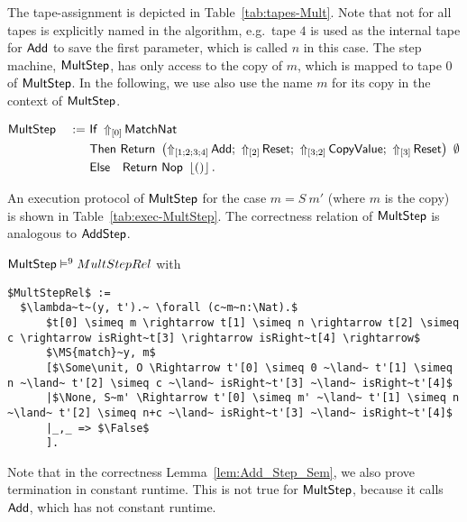 The tape-assignment is depicted in Table~\ref{tab:tapes-Mult}.  Note that not for all tapes is explicitly named in the algorithm, e.g.\ tape $4$ is
used as the internal tape for $\MS{Add}$ to save the first parameter, which is called $n$ in this case.  The step machine, $\MS{MultStep}$, has only
access to the copy of $m$, which is mapped to tape $0$ of $\MS{MultStep}$.  In the following, we use also use the name $m$ for its copy in the context
of $\MS{MultStep}$.
\begin{definition}[$\MS{MultStep}$]
  \label{def:Mult_Step}
  \begin{alignat*}{2}
    &\MS{MultStep} &~:=~&
           \MS{If}~\LiftTapes{\MS{MatchNat}}{\Vector{0}} \\
    &&& \MS{Then}  ~\Return{\left( \LiftTapes{\MS{Add}}{\Vector{1;2;3;4}} \Seq
                                \LiftTapes{\MS{Reset}}{\Vector{2}} \Seq
                                \LiftTapes{\MS{CopyValue}}{\Vector{3;2}} \Seq
                                \LiftTapes{\MS{Reset}}{\Vector{3}} \right)}{\None} \\
    &&& \MS{Else}~~~\Return{\MS{Nop}}{\Some\unit}.
  \end{alignat*}
\end{definition}
An execution protocol of $\MS{MultStep}$ for the case $m=S~m'$ (where $m$ is the copy) is shown in Table~\ref{tab:exec-MultStep}.  The correctness
relation of $\MS{MultStep}$ is analogous to $\MS{AddStep}$.
\begin{lemma}
  \label{lem:Mult_Step_Sem}
  $\MS{MultStep} \RealiseIn{9} MultStepRel$ with
  \small
\begin{lstlisting}[style=semicoqstyle]
$MultStepRel$ :=
  $\lambda~t~(y, t').~ \forall (c~m~n:\Nat).$
      $t[0] \simeq m \rightarrow t[1] \simeq n \rightarrow t[2] \simeq c \rightarrow isRight~t[3] \rightarrow isRight~t[4] \rightarrow$
      $\MS{match}~y, m$
      [$\Some\unit, O \Rightarrow t'[0] \simeq 0 ~\land~ t'[1] \simeq n ~\land~ t'[2] \simeq c ~\land~ isRight~t'[3] ~\land~ isRight~t'[4]$
      |$\None, S~m' \Rightarrow t'[0] \simeq m' ~\land~ t'[1] \simeq n ~\land~ t'[2] \simeq n+c ~\land~ isRight~t'[3] ~\land~ isRight~t'[4]$
      |_,_ => $\False$
      ].
\end{lstlisting}
\end{lemma}
Note that in the correctness Lemma~\ref{lem:Add_Step_Sem}, we also prove termination in constant runtime.  This is not true for $\MS{MultStep}$,
because it calls $\MS{Add}$, which has not constant runtime.

